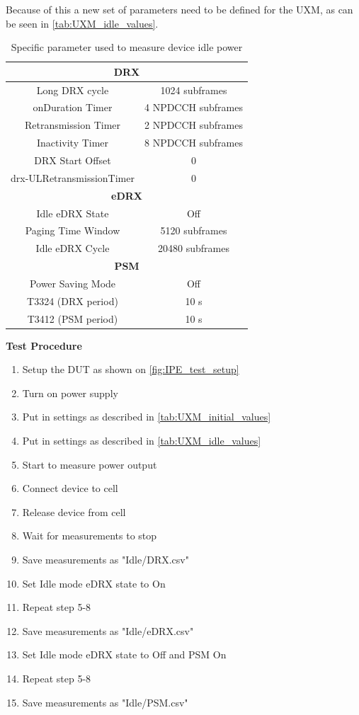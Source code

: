 Because of this a new set of parameters need to be defined for the UXM, as can be seen in \autoref{tab:UXM_idle_values}.

\begin{table}[H]
\centering
\begin{tabular}{|c|c|} \hline
\multicolumn{2}{|c|}{\textbf{DRX}}  	 \\ \hline
Long DRX cycle     	& 1024 subframes 	 \\ \hline
onDuration Timer   	& 4 NPDCCH subframes \\ \hline
Retransmission Timer & 2 NPDCCH subframes \\ \hline
Inactivity Timer   	& 8 NPDCCH subframes \\ \hline
DRX Start Offset   	& 0              	 \\ \hline
drx-ULRetransmissionTimer & 0       	 \\ \hline
\multicolumn{2}{|c|}{\textbf{eDRX}} 	 \\ \hline
Idle eDRX State		& Off				 \\ \hline
Paging Time Window  & 5120 subframes 	 \\ \hline
Idle eDRX Cycle     & 20480 subframes	 \\ \hline
\multicolumn{2}{|c|}{\textbf{PSM}}  	 \\ \hline
Power Saving Mode	& Off				 \\ \hline
T3324 (DRX period)	& 10 s    			 \\ \hline
T3412 (PSM period)	& 10 s		  		 \\ \hline
\end{tabular}
\caption{Specific parameter used to measure device idle power}
\label{tab:UXM_idle_values}
\end{table}


\textbf{Test Procedure}\\
\begin{enumerate}
\item Setup the \gls{DUT} as shown on \autoref{fig:IPE_test_setup}
\item Turn on power supply 
\item Put in settings as described in \autoref{tab:UXM_initial_values}
\item Put in settings as described in \autoref{tab:UXM_idle_values}  
\item Start to measure power output
\item Connect device to cell
\item Release device from cell
\item Wait for measurements to stop
\item Save measurements as "Idle/DRX.csv"
\item Set Idle mode eDRX state to On
\item Repeat step 5-8
\item Save measurements as "Idle/eDRX.csv"
\item Set Idle mode eDRX state to Off and PSM On
\item Repeat step 5-8
\item Save measurements as "Idle/PSM.csv"
\end{enumerate}


